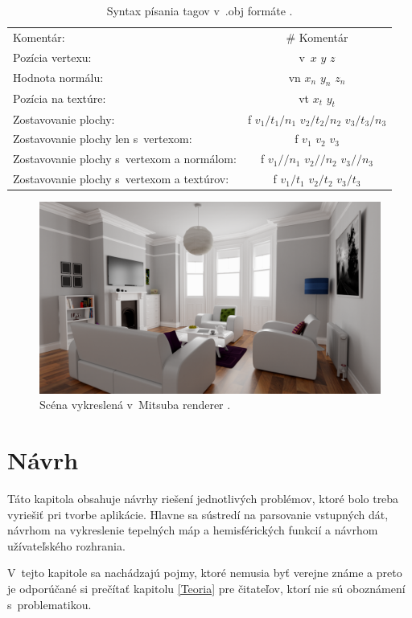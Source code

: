 \begin{table}[hb] \label{ObjTable}
\begin{tabular}{lc}
    Komentár: & \# Komentár  \\
    Pozícia vertexu: & v~$x$ $y$ $z$ \\
    Hodnota normálu: & vn $x_n$ $y_n$ $z_n$  \\
    Pozícia na textúre: & vt $x_t$ $y_t$ \\
    Zostavovanie plochy: &  f $v_1/t_1/n_1$ $v_2/t_2/n_2$ $v_3/t_3/n_3$\\
    Zostavovanie plochy len s~vertexom: &  f $v_1$ $v_2$ $v_3$\\
    Zostavovanie plochy s~vertexom a normálom: & f $v_1//n_1$ $v_2//n_2$ $v_3//n_3$\\
    Zostavovanie plochy s~vertexom a textúrov: & f $v_1/t_1$ $v_2/t_2$ $v_3/t_3$
\end{tabular}
\caption{Syntax písania tagov v~.obj formáte \cite{OBJ}.}
\end{table}

\begin{figure}[hb!] \label{MitsubaRender}
    \centering
    \includegraphics[width=0.90\linewidth]{obrazky-figures/mitsuba_render.png}
    \caption{Scéna vykreslená v~Mitsuba renderer \cite{DocsMitsuba}.}
\end{figure}

\chapter{Návrh}
\label{Navrh}
Táto kapitola obsahuje návrhy riešení jednotlivých problémov, ktoré bolo treba vyriešiť pri tvorbe aplikácie. Hlavne sa sústredí na parsovanie vstupných dát, návrhom na vykreslenie tepelných máp a hemisférických funkcií a návrhom užívateľského rozhrania. 

V~tejto kapitole sa nachádzajú pojmy, ktoré nemusia byť verejne známe a preto je odporúčané si prečítať kapitolu \ref{Teoria} pre čitateľov, ktorí nie sú oboznámení s~problematikou.
